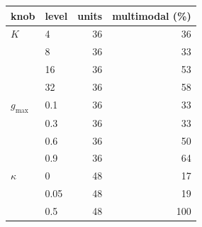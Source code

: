 \begin{tabular}{llrr}
\toprule
knob & level & units & multimodal (\%) \\
\midrule
$K$ & 4 & 36 & 36 \\
 & 8 & 36 & 33 \\
 & 16 & 36 & 53 \\
 & 32 & 36 & 58 \\
\midrule
$g_{\max}$ & 0.1 & 36 & 33 \\
 & 0.3 & 36 & 33 \\
 & 0.6 & 36 & 50 \\
 & 0.9 & 36 & 64 \\
\midrule
$\kappa$ & 0 & 48 & 17 \\
 & 0.05 & 48 & 19 \\
 & 0.5 & 48 & 100 \\
\bottomrule
\end{tabular}